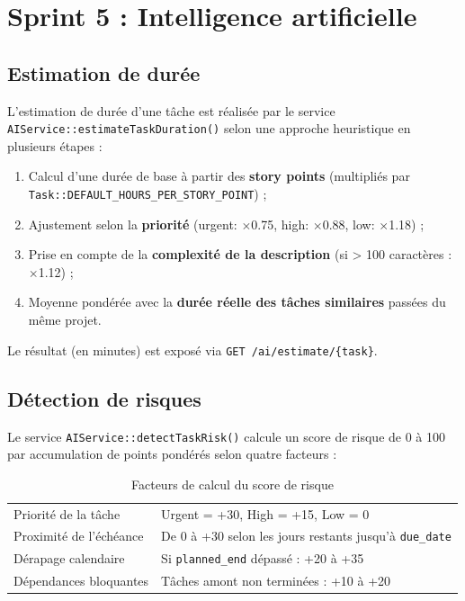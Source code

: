 \section{Sprint 5 : Intelligence artificielle}

\subsection{Estimation de durée}

L'estimation de durée d'une tâche est réalisée par le service
\texttt{AIService::estimateTaskDuration()} selon une approche heuristique en
plusieurs étapes :
\begin{enumerate}
  \item Calcul d'une durée de base à partir des \textbf{story points}
        (multipliés par \texttt{Task::DEFAULT\_HOURS\_PER\_STORY\_POINT}) ;
  \item Ajustement selon la \textbf{priorité} (urgent: $\times$0.75,
        high: $\times$0.88, low: $\times$1.18) ;
  \item Prise en compte de la \textbf{complexité de la description} (si > 100
        caractères : $\times$1.12) ;
  \item Moyenne pondérée avec la \textbf{durée réelle des tâches similaires}
        passées du même projet.
\end{enumerate}
Le résultat (en minutes) est exposé via \texttt{GET /ai/estimate/\{task\}}.

\subsection{Détection de risques}

Le service \texttt{AIService::detectTaskRisk()} calcule un score de risque
de 0 à 100 par accumulation de points pondérés selon quatre facteurs :

\begin{table}[H]
  \centering
  \caption{Facteurs de calcul du score de risque}
  \label{tab:risk_factors}
  \begin{tabularx}{\textwidth}{L{4cm}X}
    \toprule
     &  \\
    \midrule
    Priorité de la tâche      & Urgent = +30, High = +15, Low = 0 \\
    Proximité de l'échéance   & De 0 à +30 selon les jours restants jusqu'à \texttt{due\_date} \\
    Dérapage calendaire       & Si \texttt{planned\_end} dépassé : +20 à +35 \\
    Dépendances bloquantes    & Tâches amont non terminées : +10 à +20 \\
    \bottomrule
  \end{tabularx}
\end{table}


